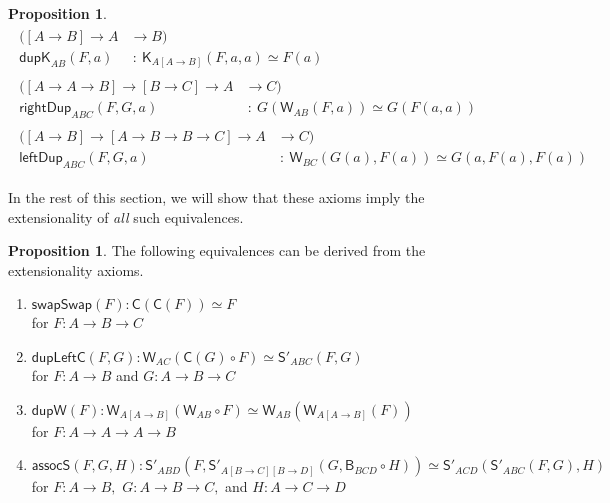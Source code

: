 \documentclass[a4paper]{article}
\theoremstyle{definition}
\newtheorem{proposition}[definition]{Proposition}
\theoremstyle{remark}
\renewcommand{\equiv}{\simeq}
\newcommand{\nm}{\mathsf}
\newcommand{\combinator}{\nm}
\newcommand{\constFun}{\combinator{K}}
\newcommand{\revCompFun}{\combinator{B}}
\newcommand{\swapFun}{\combinator{C}}
\newcommand{\dupFun}{\combinator{W}}
\newcommand{\substFun}{\combinator{S'}}
\begin{document}
\begin{proposition}
\begin{gather*}
    \begin{aligned}
                   ([A \to B] \to A &\to   B)\\
      \nm{dupK}_{AB}(F,a)           &\ :\  \constFun_{A[A{\to}B]}(F,a,a) \equiv F(a)
    \end{aligned}\\[1ex]
    \begin{aligned}
                        ([A \to A \to B] \to [B \to C] \to A &\to   C)\\
      \nm{rightDup}_{ABC}(F,G,a)                             &\ :\  G(\dupFun_{AB}(F,a)) \equiv G(F(a,a))
    \end{aligned}\\[1ex]
    \begin{aligned}
                       ([A \to B] \to [A \to B \to B \to C] \to A &\to   C)\\
      \nm{leftDup}_{ABC}(F,G,a)                                   &\ :\  \dupFun_{BC}(G(a),F(a)) \equiv G(a,F(a),F(a))
    \end{aligned}
  \end{gather*}
\end{proposition}

In the rest of this section, we will show that these axioms imply the extensionality of
\emph{all} such equivalences.

\begin{proposition}
  The following equivalences can be derived from the extensionality axioms.

  \begin{enumerate}
    \item $\nm{swapSwap}(F) : \swapFun(\swapFun(F)) \equiv F$\\for $F : A \to B \to C$
    \item $\nm{dupLeftC}(F,G) : \dupFun_{AC}(\swapFun(G) \circ F) \equiv \substFun_{ABC}(F,G)$\\
    for $F : A \to B$ and $G : A \to B \to C$
    \item $\nm{dupW}(F) : \dupFun_{A[A{\to}B]}(\dupFun_{AB} \circ F) \equiv \dupFun_{AB}(\dupFun_{A[A{\to}B]}(F))$\\
    for $F : A \to A \to A \to B$
    \item $\nm{assocS}(F,G,H) : \substFun_{ABD}(F,\substFun_{A[B{\to}C][B{\to}D]}(G,\revCompFun_{BCD} \circ H)) \equiv
                                \substFun_{ACD}(\substFun_{ABC}(F,G),H)$\\
    for $F : A \to B,$ $G : A \to B \to C,$ and $H : A \to C \to D$
  \end{enumerate}
\end{proposition}
\end{document}
